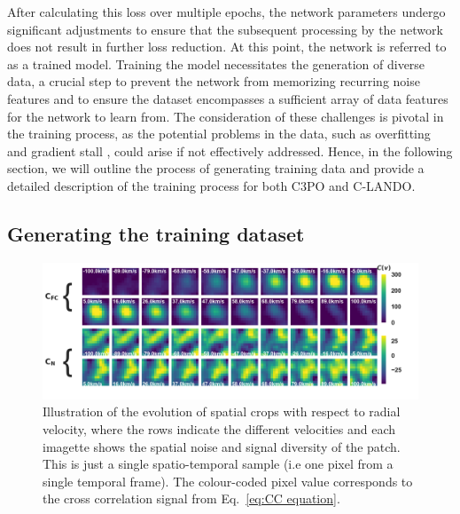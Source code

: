\documentclass{aa}
\begin{document}
After calculating this loss over multiple epochs, the network parameters undergo significant adjustments to ensure that the subsequent processing by the network does not result in further loss reduction. At this point, the network is referred to as a trained model.
Training the model necessitates the generation of diverse data, a crucial step to prevent the network from memorizing recurring noise features and to ensure the dataset encompasses a sufficient array of data features for the network to learn from. The consideration of these challenges is pivotal in the training process, as the potential problems in the data, such as overfitting \citep[][]{dietterich1995overfitting} and gradient stall \citep[][]{patel2017sgd}, could arise if not effectively addressed.
Hence, in the following section, we will outline the process of generating training data and provide a detailed description of the training process for both C3PO and C-LANDO.

\subsection{Generating the training dataset}

\begin{figure}[t]
    \includegraphics[width=\textwidth]{fig_2_dec2023_aligned_cropped.png}
    \caption{%
    Illustration of the evolution of spatial crops with respect to radial velocity, where the rows indicate the different velocities and each imagette shows the spatial noise and signal diversity of the patch. 
    This is just a single spatio-temporal sample (i.e one pixel from a single temporal frame).
    The colour-coded pixel value corresponds to the cross correlation signal from Eq.~\ref{eq:CC equation}. 
    }
    \label{fig:fig-2}
\end{figure}
\end{document}
